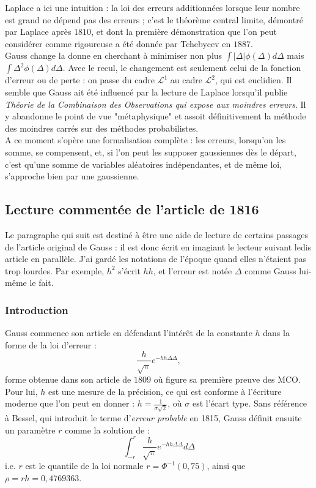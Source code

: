 \documentclass{article}
\begin{document}
Laplace a ici une intuition : la loi des erreurs additionnées lorsque leur nombre est grand ne dépend pas des erreurs ; c'est le théorème central limite, démontré par Laplace après $1810$, et dont la première démonstration que l'on peut considérer comme rigoureuse a été donnée par Tchebycev en $1887$.\\

Gauss change la donne en cherchant à minimiser non plus $\int |\Delta|\phi(\Delta)d\Delta$ mais $\int \Delta^2 \phi(\Delta)d\Delta$. Avec le recul, le changement est seulement celui de la fonction d'erreur ou de perte : on passe du cadre $\mathcal L^1$ au cadre $\mathcal L^2$, qui est euclidien. Il semble que Gauss ait été influencé par la lecture de Laplace lorsqu'il publie \textit{Théorie de la Combinaison des Observations qui expose aux moindres erreurs}. Il y abandonne le point de vue "métaphysique" \cite{Chabert} et assoit définitivement la méthode des moindres carrés sur des méthodes probabilistes.\\

A ce moment s'opère une formalisation complète : les erreurs, lorsqu'on les somme, se compensent, et, si l'on peut les supposer gaussiennes dès le départ, c'est qu'une somme de variables aléatoires indépendantes, et de même loi, s'approche bien par une gaussienne. 

\subsection{Lecture commentée de l'article de 1816}

Le paragraphe qui suit est destiné à être une aide de lecture de certains passages de l'article original de Gauss : il est donc écrit en imagiant le lecteur suivant ledis %
 article en parallèle. J'ai gardé les notations de l'époque quand elles n'étaient pas trop lourdes. Par exemple, $h^2$ s'écrit $hh$, et l'erreur est notée $\Delta$ comme Gauss lui-même le fait.

\subsubsection{Introduction} Gauss commence son article en défendant l'intérêt de la constante $h$ dans la forme de la loi d'erreur :
\[\frac{h}{\sqrt \pi}e^{-hh\Delta\Delta},\]
forme obtenue dans son article de $1809$ où figure sa première preuve des MCO. %
Pour lui, $h$ est une mesure de la précision, ce qui est conforme à l'écriture moderne que l'on peut en donner : $h=\frac{1}{\sigma\sqrt 2}$, où $\sigma$ est l'écart type. Sans référence à Bessel, qui introduit le terme d'\textit{erreur probable} en 1815, Gauss définit ensuite un paramètre $r$ comme la solution de :
\[\int_{-r}^r \frac{h}{\sqrt \pi}e^{-hh\Delta\Delta}d\Delta\] i.e. $r$ est le quantile de la loi normale $r=\Phi^{-1}(0,75)$, ainsi que $\rho=rh=0,4769363$.
\end{document}
